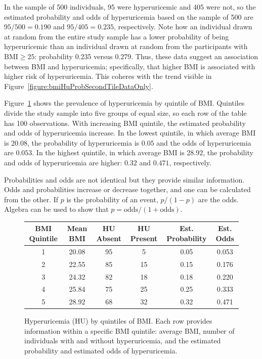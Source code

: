 In the sample of 500 individuals, 95 were hyperuricemic and 405 were not, so the estimated probability and odds of hyperuricemia based on the sample of 500 are $95/500 = 0.190$ and $95/405 = 0.235$, respectively. Note how an individual drawn at random from the entire study sample has a lower probability of being hyperuricemic than an individual drawn at random from the participants with  $\text{BMI} \geq 25$: probability 0.235 versus 0.279. Thus, these data suggest an association between BMI and hyperuricemia; specifically, that higher BMI is associated with higher risk of hyperuricemia. This coheres with the trend visible in Figure~\ref{figure:bmiHuProbSecondTileDataOnly}.

Figure~\ref{figure:huBMIQuintiles} shows the prevalence of hyperuricemia by quintile of BMI.  Quintiles divide the study sample into five groups of equal size, so each row of the table has 100 observations. With increasing BMI quintile, the estimated probability and odds of hyperuricemia increase. In the lowest quintile, in which average BMI is 20.08, the probability of hyperuricemia is $0.05$ and the odds of hyperuricemia are $0.053$. In the highest quintile, in which average BMI is 28.92, the probability and odds of hyperuricemia are higher: $0.32$ and $0.471$, respectively.

Probabilities and odds are not identical but they provide similar information. Odds and probabilities increase or decrease together, and one can be calculated from the other.  If $p$ is the probability of an event, $p/(1 - p)$ are the odds.  Algebra can be used to show that $p = \textrm{odds} / (1 + \textrm{odds})$.

\begin{figure}[ht]
\centering
\begin{tabular}{cc|cc|cc}
  \hline
  \textbf{BMI Quintile} & \textbf{Mean BMI} & \textbf{HU Absent} & \textbf{HU Present} & \textbf{Est. Probability} & \textbf{Est. Odds} \\
  \hline
  1 & 20.08 & 95 & 5 & 0.05 & 0.053 \\
  2 & 22.55 & 85 & 15 & 0.15 & 0.176 \\
  3 & 24.32 & 82 & 18 & 0.18 & 0.220 \\
  4 & 25.84 & 75 & 25 & 0.25 & 0.333\\
  5 & 28.92 & 68 & 32 & 0.32 & 0.471\\
   \hline
\end{tabular}
\caption{Hyperuricemia (HU) by quintiles of BMI. Each row provides information within a specific BMI quintile: average BMI, number of individuals with and without hyperuricemia, and the estimated probability and estimated odds of hyperuricemia.}
\label{figure:huBMIQuintiles}
\end{figure}


